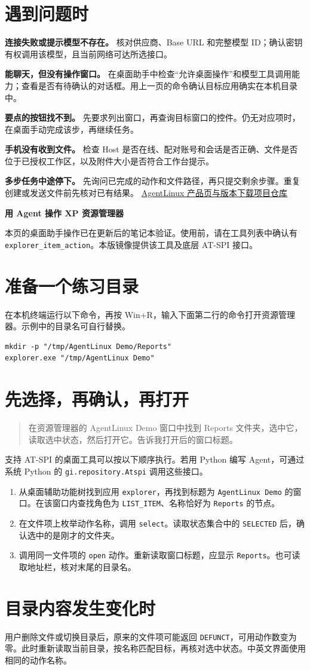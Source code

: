 \documentclass[11pt,a4paper]{article}
\newcommand{\chaptertitle}[1]{{\Large\sffamily\bfseries\color{blueink}#1}\par}
\newcommand{\sample}[1]{\begin{quote}\sffamily #1\end{quote}}
\begin{document}
\section*{遇到问题时}
\textbf{连接失败或提示模型不存在。} 核对供应商、Base URL 和完整模型 ID；确认密钥有权调用该模型，且当前网络可达所选接口。
\par\textbf{能聊天，但没有操作窗口。} 在桌面助手中检查“允许桌面操作”和模型工具调用能力；查看是否有待确认的对话框。用上一页的命令确认目标应用确实在本机目录中。
\par\textbf{要点的按钮找不到。} 先要求列出窗口，再查询目标窗口的控件。仍无对应项时，在桌面手动完成该步，再继续任务。
\par\textbf{手机没有收到文件。} 检查 Host 是否在线、配对账号和会话是否正确、文件是否位于已授权工作区，以及附件大小是否符合工作台提示。
\par\textbf{多步任务中途停下。} 先询问已完成的动作和文件路径，再只提交剩余步骤。重复创建或发送文件前先核对已有结果。
\vfill\href{https://bennix.github.io/AgentLinux/}{AgentLinux 产品页与版本下载}\hfill\href{https://github.com/bennix/AgentLinux}{项目仓库}

\newpage
\chaptertitle{用 Agent 操作 XP 资源管理器}
本页的桌面助手操作已在更新后的笔记本验证。使用前，请在工具列表中确认有 \texttt{explorer\_item\_action}。本版镜像提供该工具及底层 AT-SPI 接口。
\section*{准备一个练习目录}
在本机终端运行以下命令，再按 Win+R，输入下面第二行的命令打开资源管理器。示例中的目录名可自行替换。
\begin{verbatim}
mkdir -p "/tmp/AgentLinux Demo/Reports"
explorer.exe "/tmp/AgentLinux Demo"
\end{verbatim}
\section*{先选择，再确认，再打开}
\sample{在资源管理器的 AgentLinux Demo 窗口中找到 Reports 文件夹，选中它，读取选中状态，然后打开它。告诉我打开后的窗口标题。}
支持 AT-SPI 的桌面工具可以按以下顺序执行。若用 Python 编写 Agent，可通过系统 Python 的 \texttt{gi.repository.Atspi} 调用这些接口。
\begin{enumerate}
\item 从桌面辅助功能树找到应用 \texttt{explorer}，再找到标题为 \texttt{AgentLinux Demo} 的窗口。在该窗口内查找角色为 \texttt{LIST\_ITEM}、名称恰好为 \texttt{Reports} 的节点。
\item 在文件项上枚举动作名称，调用 \texttt{select}。读取状态集合中的 \texttt{SELECTED} 后，确认选中的是刚才的文件夹。
\item 调用同一文件项的 \texttt{open} 动作。重新读取窗口标题，应显示 \texttt{Reports}。也可读取地址栏，核对末尾的目录名。
\end{enumerate}
\section*{目录内容发生变化时}
用户删除文件或切换目录后，原来的文件项可能返回 \texttt{DEFUNCT}，可用动作数变为零。此时重新读取当前目录，按名称匹配目标，再核对选中状态。中英文界面使用相同的动作名称。
\end{document}

